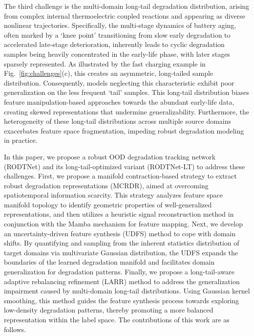 \documentclass[lettersize,journal]{IEEEtran}
\begin{document}
The third challenge is the multi-domain long-tail degradation distribution, arising from complex internal thermoelectric coupled reactions and appearing as diverse nonlinear trajectories.
%
Specifically, the multi-stage dynamics of battery aging, often marked by a `knee point' transitioning from slow early degradation to accelerated late-stage deterioration, inherently leads to cyclic degradation samples being heavily concentrated in the early-life phase, with later stages sparsely represented.
% 
As illustrated by the fast charging example in Fig.~\ref{fig:challenges}(c), this creates an asymmetric, long-tailed sample distribution. Consequently, models neglecting this characteristic exhibit poor generalization on the less frequent `tail' samples. 
% 
This long-tail distribution biases feature manipulation-based approaches towards the abundant early-life data, creating skewed representations that undermine generalizability. Furthermore, the heterogeneity of these long-tail distributions across multiple source domains exacerbates feature space fragmentation, impeding robust degradation modeling in practice.

In this paper, we propose a robust OOD degradation tracking network (RODTNet) and its long-tail-optimized variant (RODTNet-LT) to address these challenges.
% 
First, we propose a manifold contraction-based strategy to extract robust degradation representations (MCRDR), aimed at overcoming spatiotemporal information scarcity. This strategy analyzes feature space manifold topology to identify geometric properties of well-generalized representations, and then utilizes a heuristic signal reconstruction method in conjunction with the Mamba mechanism for feature mapping.
% 
Next, we develop an uncertainty-driven feature synthesis (UDFS) method to cope with domain shifts. By quantifying and sampling from the inherent statistics distribution of target domains via multivariate Gaussian distribution, the UDFS expands the boundaries of the learned degradation manifold and facilitates domain generalization for degradation patterns.
% 
Finally, we propose a long-tail-aware adaptive rebalancing refinement (LARR) method to address the generalization impairment caused by multi-domain long-tail distributions. Using Gaussian kernel smoothing, this method guides the feature synthesis process towards exploring low-density degradation patterns, thereby promoting a more balanced representation within the label space.
% 
The contributions of this work are as follows.
\end{document}
